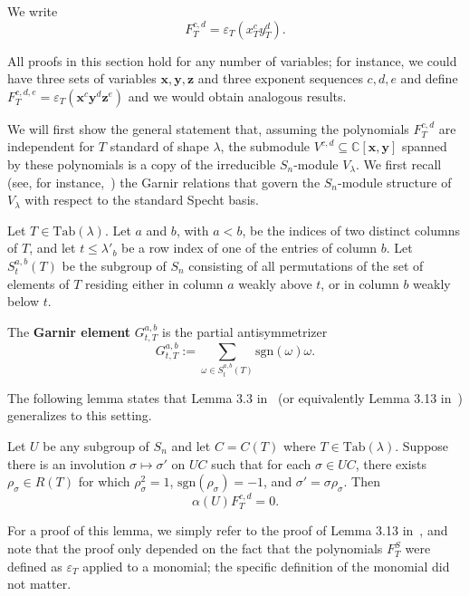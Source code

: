 \documentclass[ALCO,Unicode]{cedram}
\newcommand{\sgn}{\mathrm{sgn}}
\newcommand{\Tab}{\mathrm{Tab}}
\begin{document}
\begin{definition}
	We write $$F_T^{c,d}=\varepsilon_T (x_T^cy_T^d).$$
\end{definition}


\begin{remark}
	All proofs in this section  hold for any number of variables; for instance, we could have three sets of variables $\mathbf{x},\mathbf{y},\mathbf{z}$ and three exponent sequences $c,d,e$ and define $F_T^{c,d,e}=\varepsilon_T (\mathbf{x}^c\mathbf{y}^d\mathbf{z}^e)$ and we would obtain analogous results.
\end{remark}

We will first show the general statement that, assuming the polynomials $F_T^{c,d}$ are independent for $T$ standard of shape $\lambda$, the submodule $V^{c,d}\subseteq \mathbb{C}[\mathbf{x},\mathbf{y}]$ spanned by these polynomials is a copy of the irreducible $S_n$-module $V_\lambda$.  We first recall (see, for instance,~\cite{Peel}) the Garnir relations that govern the $S_n$-module structure of $V_\lambda$ with respect to the standard Specht basis.


\begin{definition}
	Let $T\in \Tab(\lambda)$.  Let $a$ and $b$, with $a<b$, be the indices of two distinct columns of $T$, and let $t\le \lambda'_b$ be a row index of one of the entries of column $b$.  Let~$S^{a,b}_t(T)$ be the subgroup of $S_n$ consisting of all permutations of the set of elements of $T$ residing either in column $a$ weakly above $t$, or in column $b$ weakly below $t$. 
	
	The \textbf{Garnir element} $G^{a,b}_{t,T}$ is the partial antisymmetrizer $$G^{a,b}_{t,T}:=\sum_{\omega\in S^{a,b}_t(T)} \mathrm{sgn}(\omega)\omega.$$
\end{definition}

The following lemma states that Lemma 3.3 in~\cite{Peel} (or equivalently Lemma 3.13 in~\cite{GillespieRhoades}) generalizes to this setting.

\begin{lemma}\label{lem:alpha}
	Let $U$ be any subgroup of $S_n$ and let $C=C(T)$ where $T\in \Tab(\lambda)$.  Suppose there is an involution $\sigma\mapsto \sigma'$ on $UC$ such that for each $\sigma\in UC$, there exists $\rho_\sigma\in R(T)$ for which $\rho_\sigma^2=1$, $\sgn(\rho_\sigma)=-1$, and $\sigma'=\sigma\rho_\sigma$.  Then $$\alpha(U) F_T^{c,d}=0.$$
\end{lemma}

For a proof of this lemma, we simply refer to the proof of Lemma 3.13 in~\cite{GillespieRhoades}, and note that the proof only depended on the fact that the polynomials $F_T^S$ were defined as $\varepsilon_T$ applied to a monomial; the specific definition of the monomial did not matter.
\end{document}
